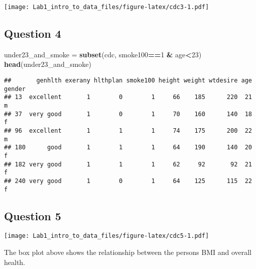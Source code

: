 \documentclass[]{article}
\newenvironment{Shaded}{\begin{snugshade}}{\end{snugshade}}
\newcommand{\DataTypeTok}[1]{\textcolor[rgb]{0.13,0.29,0.53}{#1}}
\newcommand{\DecValTok}[1]{\textcolor[rgb]{0.00,0.00,0.81}{#1}}
\newcommand{\KeywordTok}[1]{\textcolor[rgb]{0.13,0.29,0.53}{\textbf{#1}}}
\newcommand{\NormalTok}[1]{#1}
\newcommand{\OperatorTok}[1]{\textcolor[rgb]{0.81,0.36,0.00}{\textbf{#1}}}
\newcommand{\StringTok}[1]{\textcolor[rgb]{0.31,0.60,0.02}{#1}}
\begin{document}
\texttt{[image: Lab1\_intro\_to\_data\_files/figure-latex/cdc3-1.pdf]}

\hypertarget{question-4}{%
\subsection{Question 4}\label{question-4}}

\begin{Shaded}
\begin{Highlighting}[]
\NormalTok{under23_and_smoke =}\StringTok{ }\KeywordTok{subset}\NormalTok{(cdc, smoke100}\OperatorTok{==}\DecValTok{1} \OperatorTok{&}\StringTok{ }\NormalTok{age}\OperatorTok{<}\DecValTok{23}\NormalTok{)}
\KeywordTok{head}\NormalTok{(under23_and_smoke)}
\end{Highlighting}
\end{Shaded}

\begin{verbatim}
##       genhlth exerany hlthplan smoke100 height weight wtdesire age gender
## 13  excellent       1        0        1     66    185      220  21      m
## 37  very good       1        0        1     70    160      140  18      f
## 96  excellent       1        1        1     74    175      200  22      m
## 180      good       1        1        1     64    190      140  20      f
## 182 very good       1        1        1     62     92       92  21      f
## 240 very good       1        0        1     64    125      115  22      f
\end{verbatim}

\hypertarget{question-5}{%
\subsection{Question 5}\label{question-5}}

\texttt{[image: Lab1\_intro\_to\_data\_files/figure-latex/cdc5-1.pdf]}

The box plot above shows the relationship between the persons BMI and
overall health.

\begin{Shaded}
\end{Shaded}
\end{document}
